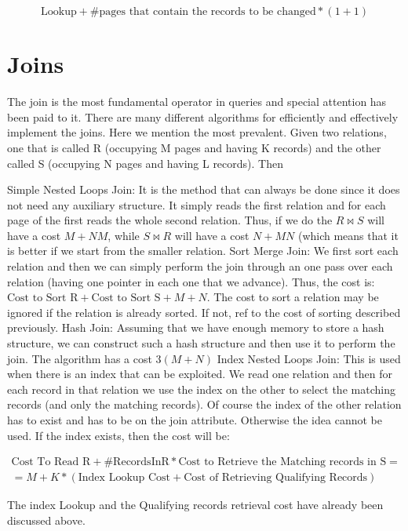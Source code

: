 \documentclass[12pt]{article}
\begin{document}
$$
\text{Lookup} + \text{\#pages that contain the records to be changed} * (1 + 1)
$$

\section{Joins}

The join is the most fundamental operator in queries and special attention has been paid to it. There are many different algorithms for efficiently and effectively implement the joins. Here we mention the most prevalent. Given two relations, one that is called R (occupying M pages and having K records) and the other called S (occupying N pages and having L records). Then

Simple Nested Loops Join: It is the method that can always be done since it does not need any auxiliary structure. It simply reads the first relation and for each page of the first reads the whole second relation. Thus, if we do the $R\bowtie S$ will have a cost $M + NM$, while $S \bowtie R$ will have a cost $N + MN$ (which means that it is better if we start from the smaller relation.
Sort Merge Join: We first sort each relation and then we can simply perform the join through an one pass over each relation (having one pointer in each one that we advance). Thus, the cost is: $\text{Cost to Sort R} + \text{Cost to Sort S} + M + N$. The cost to sort a relation may be ignored if the relation is already sorted. If not, ref to the cost of sorting described previously.
Hash Join: Assuming that we have enough memory to store a hash structure, we can construct such a hash structure and then use it to perform the join. The algorithm has a cost $3(M+N)$
Index Nested Loops Join: This is used when there is an index that can be exploited. We read one relation and then for each record in that relation we use the index on the other to select the matching records (and only the matching records). Of course the index of the other relation has to exist and has to be on the join attribute. Otherwise the idea cannot be used. If the index exists, then the cost will be:

\begin{align*}
\text{Cost To Read R} + \text{\#RecordsInR} * \text{Cost to Retrieve the Matching records in S} = \\
 = M + K * (\text{Index Lookup Cost} + \text{Cost of Retrieving Qualifying Records})
\end{align*}

The index Lookup and the Qualifying records retrieval cost have already been discussed above.
\end{document}
